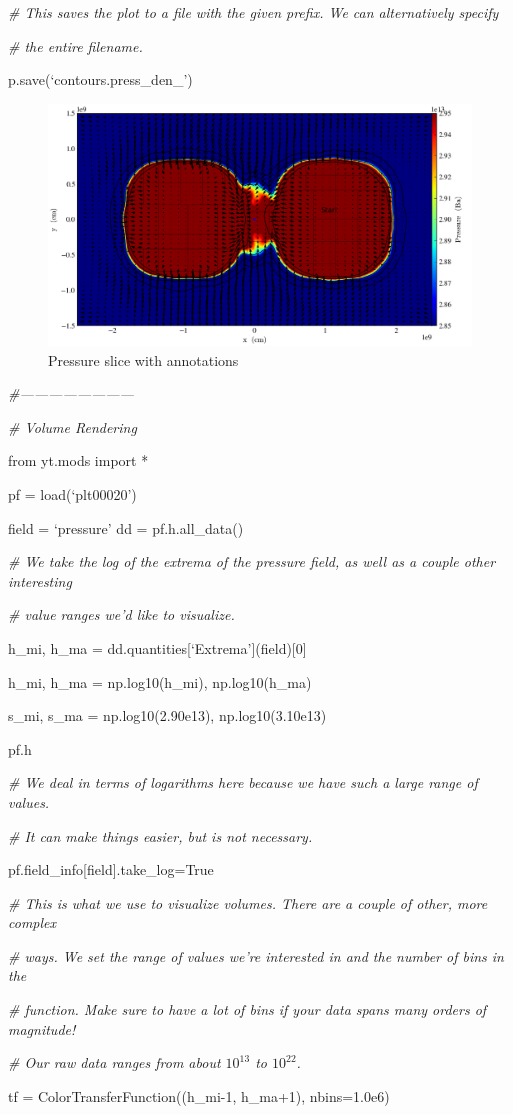{\it\# This saves the plot to a file with the given prefix. We can alternatively specify}
{\setlength{\parskip}{0pt}

{\it\# the entire filename.}

p.save(`contours.press\_den\_')
}
\begin{figure}[h]
\centering
\includegraphics[width=6in]{Slice_z_pressure}
\caption{Pressure slice with annotations}
\end{figure}

{\it\#------------------------}


{\it\# Volume Rendering}
{\setlength{\parskip}{0pt}

from yt.mods import *
}

pf = load(`plt00020')

field = `pressure'
dd = pf.h.all\_data()

{\it\# We take the log of the extrema of the pressure field, as well as a couple other interesting}
{\setlength{\parskip}{0pt}

{\it\# value ranges we'd like to visualize.}

h\_mi, h\_ma = dd.quantities[`Extrema'](field)[0]
}

h\_mi, h\_ma = np.log10(h\_mi), np.log10(h\_ma)

s\_mi, s\_ma =  np.log10(2.90e13), np.log10(3.10e13)

pf.h

{\it\# We deal in terms of logarithms here because we have such a large range of values.}
{\setlength{\parskip}{0pt}

{\it\# It can make things easier, but is not necessary.}

pf.field\_info[field].take\_log=True
}

{\it\# This is what we use to visualize volumes. There are a couple of other, more complex}
{\setlength{\parskip}{0pt}

{\it\# ways. We set the range of values we're interested in and the number of bins in the}

{\it\# function. Make sure to have a lot of bins if your data spans many orders of magnitude!}

{\it\# Our raw data ranges from about $10^{13}$ to $10^{22}$.}

tf = ColorTransferFunction((h\_mi-1, h\_ma+1), nbins=1.0e6)
}

